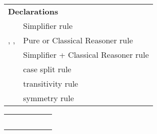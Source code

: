 \begin{isabellebody}
\begin{isamarkuptext}
\begin{tabular}{ll}
    \multicolumn{2}{l}{\textbf{Declarations}} \\[0.5ex]
    \hyperlink{attribute.simp}{\mbox{\isa{simp}}} & Simplifier rule \\
    \hyperlink{attribute.intro}{\mbox{\isa{intro}}}, \hyperlink{attribute.elim}{\mbox{\isa{elim}}}, \hyperlink{attribute.dest}{\mbox{\isa{dest}}} & Pure or Classical Reasoner rule \\
    \hyperlink{attribute.iff}{\mbox{\isa{iff}}} & Simplifier + Classical Reasoner rule \\
    \hyperlink{attribute.split}{\mbox{\isa{split}}} & case split rule \\
    \hyperlink{attribute.trans}{\mbox{\isa{trans}}} & transitivity rule \\
    \hyperlink{attribute.sym}{\mbox{\isa{sym}}} & symmetry rule \\
  \end{tabular}%
\end{isamarkuptext}%
\isamarkuptrue%
%
\isamarkuptrue%
%
\begin{isamarkuptext}%
\begin{tabular}{l|lllll}
      & \hyperlink{method.rule}{\mbox{\isa{rule}}} & \hyperlink{method.iprover}{\mbox{\isa{iprover}}} & \hyperlink{method.blast}{\mbox{\isa{blast}}} & \hyperlink{method.simp}{\mbox{\isa{simp}}} & \hyperlink{method.auto}{\mbox{\isa{auto}}} \\
      &                &                   & \hyperlink{method.fast}{\mbox{\isa{fast}}} & \hyperlink{method.simp-all}{\mbox{\isa{simp{\isacharunderscore}all}}} & \hyperlink{method.force}{\mbox{\isa{force}}} \\
    \hline
    \hyperlink{attribute.Pure.elim}{\mbox{\isa{Pure{\isachardot}elim}}}\isa{{\isachardoublequote}{\isacharbang}{\isachardoublequote}} \hyperlink{attribute.Pure.intro}{\mbox{\isa{Pure{\isachardot}intro}}}\isa{{\isachardoublequote}{\isacharbang}{\isachardoublequote}}
      & \isa{{\isachardoublequote}{\isasymtimes}{\isachardoublequote}}    & \isa{{\isachardoublequote}{\isasymtimes}{\isachardoublequote}} \\
    \hyperlink{attribute.Pure.elim}{\mbox{\isa{Pure{\isachardot}elim}}} \hyperlink{attribute.Pure.intro}{\mbox{\isa{Pure{\isachardot}intro}}}
      & \isa{{\isachardoublequote}{\isasymtimes}{\isachardoublequote}}    & \isa{{\isachardoublequote}{\isasymtimes}{\isachardoublequote}} \\
    \hyperlink{attribute.elim}{\mbox{\isa{elim}}}\isa{{\isachardoublequote}{\isacharbang}{\isachardoublequote}} \hyperlink{attribute.intro}{\mbox{\isa{intro}}}\isa{{\isachardoublequote}{\isacharbang}{\isachardoublequote}}

\end{tabular}
\end{isamarkuptext}
\end{isabellebody}
